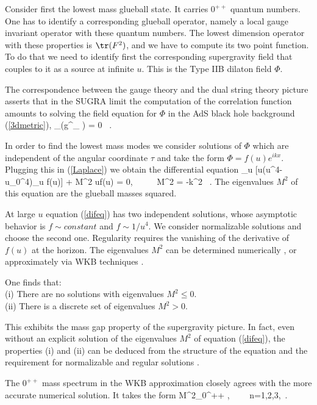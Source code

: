 Consider first the lowest mass glueball state.
It carries $0^{++}$ quantum numbers.
One has to identify a corresponding glueball
operator, namely a local gauge invariant operator with these quantum numbers.
The lowest  dimension operator with these properties is $\tr(F^2)$,
and we have to compute its two point function. 
To do that we need to identify first
the corresponding supergravity field that couples to it as a source
at infinite $u$.
This is the Type IIB dilaton field $\Phi$. 

The correspondence  between the gauge theory and the dual string 
theory picture asserts that in the SUGRA limit the 
computation of the correlation function amounts
to solving the field equation for $\Phi$ in the AdS black hole background
(\ref{3dmetric}),
\beq
\partial_{\mu}(g^{\mu\nu}\partial_{\nu} \Phi) = 0 \ .
\label{Laplace}
\eeq

In order to find the lowest mass modes we consider solutions of $\Phi$
which are independent of the angular coordinate $\tau$ and take the
form $\Phi = f(u)e^{ikx}$.  Plugging this in (\ref{Laplace}) we obtain
the differential equation
\beq
\partial_u [u(u^4-u_0^4)\partial_u f(u)] + M^2 uf(u) = 0,~~~~~ M^2 = -k^2 \ .
\label{difeq}
\eeq
The eigenvalues $M^2$ of this equation are the glueball masses squared.


At large $u$ equation (\ref{difeq}) has two independent solutions, 
whose asymptotic behavior is $f
\sim constant$ and $f\sim 1/u^4$. We consider normalizable solutions
and choose the second one.  Regularity requires the vanishing of the
derivative of $f(u)$ at the horizon.  The eigenvalues $M^2$ can be
determined numerically \cite{Csaki:1998gm,Koch:1998eo, Zyskin:1998an}, 
or approximately via WKB techniques \cite{Csaki:1998gm, Minahan:1999tm}.

One finds that:\\
(i) There are no solutions with eigenvalues $M^2 \leq 0$.\\
(ii) There is a discrete set of eigenvalues $M^2 > 0$.

This exhibits the mass gap property of the supergravity picture.  In
fact, even without an explicit solution of the eigenvalues $M^2$ of
equation (\ref{difeq}), the properties (i) and (ii) can be deduced
from the structure of the equation and the requirement for
normalizable and regular solutions \cite{Witten:1998zw}.

The $0^{++}$ mass spectrum in the WKB approximation closely agrees with the
more accurate numerical solution.
It takes the form
\beq
M^2_{0^{++}} \approx {},~~~~ n=1,2,3,\cdots \ .
\label{spectrum}
\eeq


